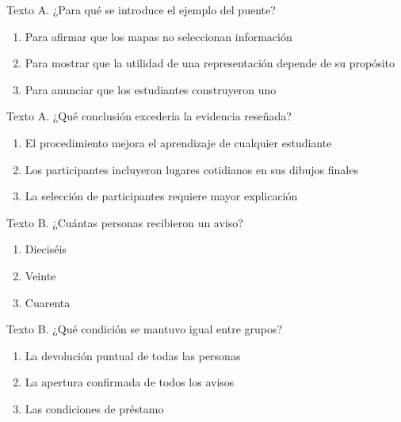 \noindent\begin{minipage}{\linewidth}\setlength{\parskip}{4pt}\label{q:L-005}
Texto A. ¿Para qué se introduce el ejemplo del puente?
\begin{enumerate}[label=\Alph*),nosep]
\item Para afirmar que los mapas no seleccionan información
\item Para mostrar que la utilidad de una representación depende de su propósito
\item Para anunciar que los estudiantes construyeron uno
\end{enumerate}\end{minipage}\par\medskip

\noindent\begin{minipage}{\linewidth}\setlength{\parskip}{4pt}\label{q:L-006}
Texto A. ¿Qué conclusión excedería la evidencia reseñada?
\begin{enumerate}[label=\Alph*),nosep]
\item El procedimiento mejora el aprendizaje de cualquier estudiante
\item Los participantes incluyeron lugares cotidianos en sus dibujos finales
\item La selección de participantes requiere mayor explicación
\end{enumerate}\end{minipage}\par\medskip

\noindent\begin{minipage}{\linewidth}\setlength{\parskip}{4pt}\label{q:L-007}
Texto B. ¿Cuántas personas recibieron un aviso?
\begin{enumerate}[label=\Alph*),nosep]
\item Dieciséis
\item Veinte
\item Cuarenta
\end{enumerate}\end{minipage}\par\medskip

\noindent\begin{minipage}{\linewidth}\setlength{\parskip}{4pt}\label{q:L-008}
Texto B. ¿Qué condición se mantuvo igual entre grupos?
\begin{enumerate}[label=\Alph*),nosep]
\item La devolución puntual de todas las personas
\item La apertura confirmada de todos los avisos
\item Las condiciones de préstamo
\end{enumerate}\end{minipage}\par\medskip

